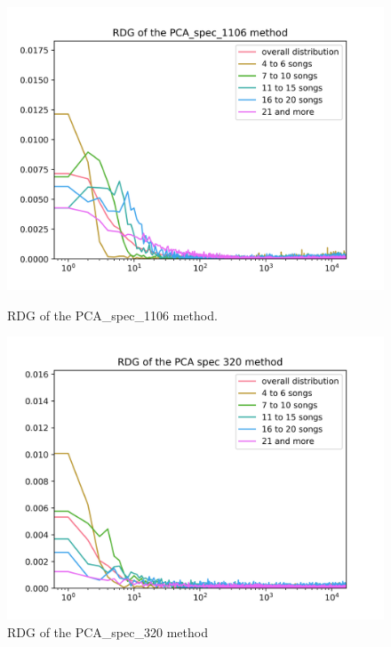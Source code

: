 \begin{figure}[h]
\centering
\begin{minipage}{.45\textwidth}
  \centering
  \includegraphics[width=1\linewidth]{./img/pca_spec_1106_graph.png}
  \caption{RDG of the PCA\_spec\_1106 method.}
  \label{fig:pca_spec_1106_distribution}
\end{minipage}
 \vspace{1cm}
\begin{minipage}{.45\textwidth}
  \centering
  \includegraphics[width=1\linewidth]{./img/pca_spec_320_graph.png}
  \caption{RDG of the PCA\_spec\_320 method}
  \label{fig:pca_spec_320_distribution}
\end{minipage}
\end{figure}

